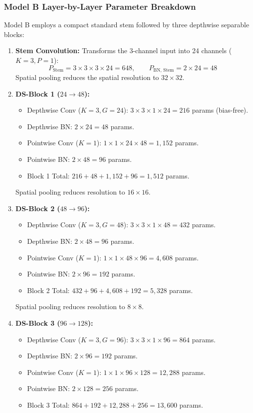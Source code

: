 \documentclass[11pt,a4paper]{article}
\begin{document}
\subsubsection{Model B Layer-by-Layer Parameter Breakdown}
Model B employs a compact standard stem followed by three depthwise separable blocks:
\begin{enumerate}[leftmargin=*,itemsep=2pt]
  \item \textbf{Stem Convolution:} Transforms the 3-channel input into 24 channels ($K=3, P=1$):
  \begin{equation}
    P_{\text{Stem}} = 3 \times 3 \times 3 \times 24 = 648, \qquad P_{\text{BN, Stem}} = 2 \times 24 = 48
  \end{equation}
  Spatial pooling reduces the spatial resolution to $32 \times 32$.
  
  \item \textbf{DS-Block 1 ($24 \to 48$):}
  \begin{itemize}
    \item Depthwise Conv ($K=3, G=24$): $3 \times 3 \times 1 \times 24 = 216$ params (bias-free).
    \item Depthwise BN: $2 \times 24 = 48$ params.
    \item Pointwise Conv ($K=1$): $1 \times 1 \times 24 \times 48 = 1,152$ params.
    \item Pointwise BN: $2 \times 48 = 96$ params.
    \item Block 1 Total: $216 + 48 + 1,152 + 96 = 1,512$ params.
  \end{itemize}
  Spatial pooling reduces resolution to $16 \times 16$.
  
  \item \textbf{DS-Block 2 ($48 \to 96$):}
  \begin{itemize}
    \item Depthwise Conv ($K=3, G=48$): $3 \times 3 \times 1 \times 48 = 432$ params.
    \item Depthwise BN: $2 \times 48 = 96$ params.
    \item Pointwise Conv ($K=1$): $1 \times 1 \times 48 \times 96 = 4,608$ params.
    \item Pointwise BN: $2 \times 96 = 192$ params.
    \item Block 2 Total: $432 + 96 + 4,608 + 192 = 5,328$ params.
  \end{itemize}
  Spatial pooling reduces resolution to $8 \times 8$.
  
  \item \textbf{DS-Block 3 ($96 \to 128$):}
  \begin{itemize}
    \item Depthwise Conv ($K=3, G=96$): $3 \times 3 \times 1 \times 96 = 864$ params.
    \item Depthwise BN: $2 \times 96 = 192$ params.
    \item Pointwise Conv ($K=1$): $1 \times 1 \times 96 \times 128 = 12,288$ params.
    \item Pointwise BN: $2 \times 128 = 256$ params.
    \item Block 3 Total: $864 + 192 + 12,288 + 256 = 13,600$ params.
  \end{itemize}
  

\end{enumerate}
\end{document}
